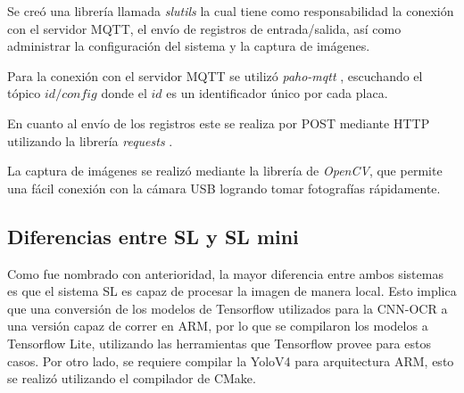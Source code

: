 Se creó una librería llamada \textit{slutils} la cual tiene como responsabilidad la conexión con el servidor MQTT, el envío de registros de entrada/salida, así como administrar la configuración del sistema y la captura de imágenes.

Para la conexión con el servidor MQTT se utilizó \textit{paho-mqtt} \cite{craggs_documentacion_nodate}, escuchando el tópico \textit{$id/config$} donde el $id$ es un identificador único por cada placa.

En cuanto al envío de los registros este se realiza por POST mediante HTTP utilizando la librería \textit{requests} \cite{python_software_foundation_documentacion_nodate}.

La captura de imágenes se realizó mediante la librería de \textit{OpenCV}, que permite una fácil conexión con la cámara USB logrando tomar fotografías rápidamente.

\subsection{Diferencias entre SL y SL mini}

Como fue nombrado con anterioridad, la mayor diferencia entre ambos sistemas es que el sistema SL es capaz de procesar la imagen de manera local. Esto implica que una conversión de los modelos de Tensorflow \cite{google_tensorflow_nodate} utilizados para la CNN-OCR a una versión capaz de correr en ARM, por lo que se compilaron los modelos a Tensorflow Lite, utilizando las herramientas que Tensorflow provee para estos casos. Por otro lado, se requiere compilar la YoloV4 para arquitectura ARM, esto se realizó utilizando el compilador de CMake.

